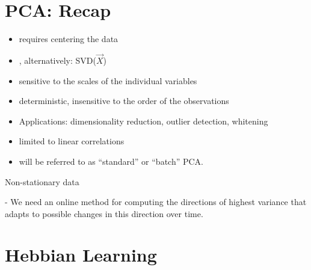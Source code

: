 
\section{PCA: Recap}

\begin{frame}{\secname}

\begin{itemize}
\item requires centering the data
\item {}, alternatively: SVD($\vec X$)
\item sensitive to the scales of the individual variables
\item deterministic, insensitive to the order of the observations
\item Applications: dimensionality reduction, outlier detection, whitening
\item limited to linear correlations
\item will be referred to as ``standard'' or ``batch'' PCA.
\end{itemize}

\end{frame}

\begin{frame}{Non-stationary data}

\pause

\svspace{35mm}


\pause

- We need an online method for computing the directions of highest variance that adapts to possible changes in this direction over time.

\end{frame}

\section{Hebbian Learning}


